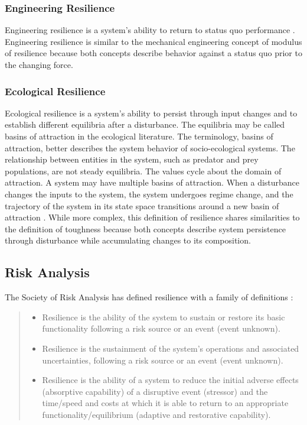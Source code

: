 \subsubsection{Engineering Resilience}
Engineering resilience is a system's ability to return to status quo
performance \cite{Holling2010}. Engineering resilience is similar to
the mechanical engineering concept of modulus of resilience because
both concepts describe behavior against a status quo prior to the
changing force.

\subsubsection{Ecological Resilience}
Ecological resilience is a system's ability to persist through input
changes and to establish different equilibria after a disturbance. The
equilibria may be called basins of attraction in the ecological
literature. The terminology, basins of attraction, better describes
the system behavior of socio-ecological systems. The relationship
between entities in the system, such as predator and prey populations,
are not steady equilibria. The values cycle about the domain of
attraction. A system may have multiple basins of attraction. When a
disturbance changes the inputs to the system, the system undergoes
regime change, and the trajectory of the system in its state space
transitions around a new basin of attraction \cite{Folke2010a}. While
more complex, this definition of resilience shares similarities to the
definition of toughness because both concepts describe system
persistence through disturbance while accumulating changes to its
composition.

\subsection{Risk Analysis}
The Society of Risk Analysis has defined resilience with a family of
definitions \cite{Aven2015b}:
\begin{quotation}
  \begin{itemize}
    \item Resilience is the ability of the system to sustain or
      restore its basic functionality following a risk source or an
      event (event unknown).
    \item Resilience is the sustainment of the system's operations
      and associated uncertainties, following a risk source or an
      event (event unknown).
    \item Resilience is the ability of a system to reduce the initial
      adverse effects (absorptive capability) of a disruptive event
      (stressor) and the time/speed and costs at which it is able to
      return to an appropriate functionality/equilibrium (adaptive and
      restorative capability).
  \end{itemize}
\end{quotation}

